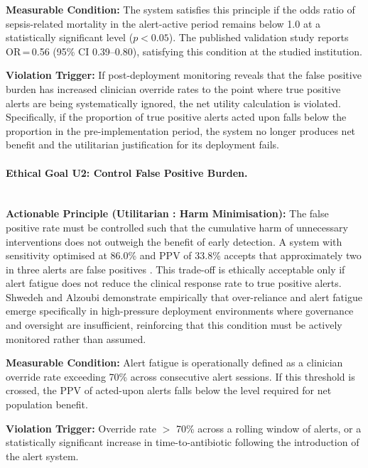 \documentclass[]{UCD_CS_41820_Report}
\begin{document}
\medskip
\textbf{Measurable Condition:} The system satisfies this principle if the odds
ratio of sepsis-related mortality in the alert-active period remains below 1.0 at
a statistically significant level ($p < 0.05$). The published validation study
\cite{cull2023} reports OR\,=\,0.56 (95\% CI 0.39--0.80), satisfying this condition
at the studied institution.\par

\medskip
\textbf{Violation Trigger:} If post-deployment monitoring reveals that the false
positive burden has increased clinician override rates to the point where true
positive alerts are being systematically ignored, the net utility calculation is
violated. Specifically, if the proportion of true positive alerts acted upon falls
below the proportion in the pre-implementation period, the system no longer produces
net benefit and the utilitarian justification for its deployment fails.\par

\paragraph{Ethical Goal U2: Control False Positive Burden.}~\\

\textbf{Actionable Principle (Utilitarian : Harm Minimisation):}
The false positive rate must be controlled such that the cumulative harm of
unnecessary interventions does not outweigh the benefit of early detection. A system
with sensitivity optimised at 86.0\% and PPV of 33.8\% accepts that approximately
two in three alerts are false positives \cite{cull2023}. This trade-off is ethically
acceptable only if alert fatigue does not reduce the clinical response rate to true
positive alerts. Shwedeh and Alzoubi \cite{shwedeh2025} demonstrate empirically that
over-reliance and alert fatigue emerge specifically in high-pressure deployment
environments where governance and oversight are insufficient, reinforcing that this
condition must be actively monitored rather than assumed.\par

\medskip
\textbf{Measurable Condition:} Alert fatigue is operationally defined as a clinician
override rate exceeding 70\% across consecutive alert sessions. If this threshold is
crossed, the PPV of acted-upon alerts falls below the level required for net
population benefit.\par

\medskip
\textbf{Violation Trigger:} Override rate $>$ 70\% across a rolling window of alerts,
or a statistically significant increase in time-to-antibiotic following the
introduction of the alert system.\par
\end{document}
